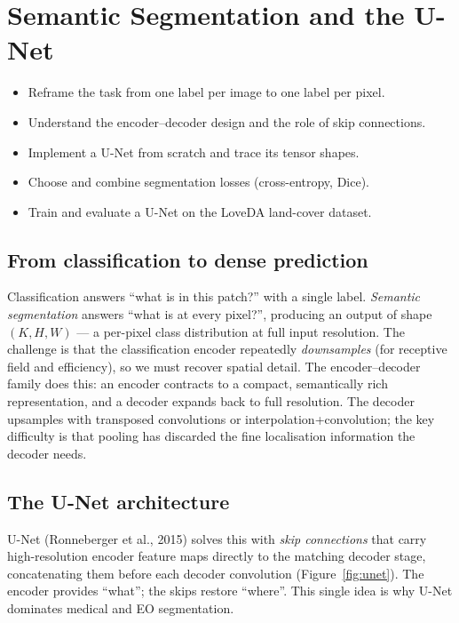 \chapter{Semantic Segmentation and the U-Net}
\label{ch:seg}


\begin{objbox}
\begin{itemize}[leftmargin=1.2em,nosep]
  \item Reframe the task from one label per image to one label per pixel.
  \item Understand the encoder--decoder design and the role of skip connections.
  \item Implement a U-Net from scratch and trace its tensor shapes.
  \item Choose and combine segmentation losses (cross-entropy, Dice).
  \item Train and evaluate a U-Net on the LoveDA land-cover dataset.
\end{itemize}
\end{objbox}

\section{From classification to dense prediction}

Classification answers ``what is in this patch?'' with a single label.
\emph{Semantic segmentation} answers ``what is at every pixel?'', producing an
output of shape $(K,H,W)$ --- a per-pixel class distribution at full input
resolution. The challenge is that the classification encoder repeatedly
\emph{downsamples} (for receptive field and efficiency), so we must recover
spatial detail. The encoder--decoder family does this: an encoder contracts to a
compact, semantically rich representation, and a decoder expands back to full
resolution. The decoder upsamples with transposed convolutions or
interpolation+convolution; the key difficulty is that pooling has discarded the
fine localisation information the decoder needs.

\section{The U-Net architecture}

U-Net (Ronneberger et al., 2015) solves this with \emph{skip connections} that
carry high-resolution encoder feature maps directly to the matching decoder
stage, concatenating them before each decoder convolution
(Figure~\ref{fig:unet}). The encoder provides ``what''; the skips restore
``where''. This single idea is why U-Net dominates medical and EO segmentation.

